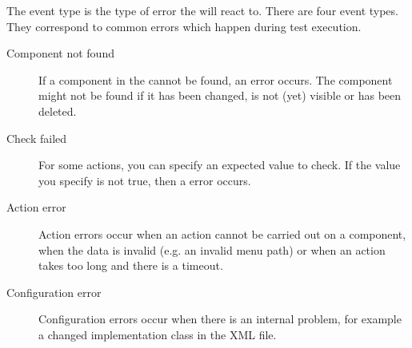 
\label{eventtype}

The event type is the type of error the \gdehandler{} will react to. 
There are four event types. They correspond to common errors which happen during test execution. 

\begin{description}
\item [Component not found]{If a component in the \gdaut{} cannot be found, an error occurs. The component might not be found if it has been changed, is not (yet) visible or has been deleted. }
\item [Check failed]{For some actions, you can specify an expected value to check. If the value you specify is not true, then a  error occurs.} 
\item [Action error]{Action errors occur when an action cannot be carried out on a component, when the data is invalid (e.g. an invalid menu path) or when an action takes too long and there is a timeout.}
\item [Configuration error]{Configuration errors occur when there is an internal problem, for example a changed implementation class in the XML file. }
\end{description}

